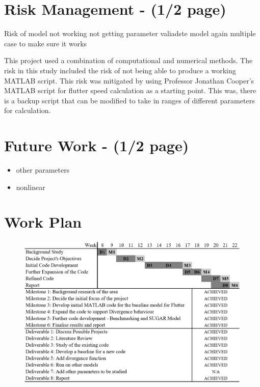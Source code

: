 \documentclass[11pt]{article}
\begin{document}
\section{Risk Management - (1/2 page)}
Risk of model not working
not getting parameter
valiadste model again multiple case to make sure it works

This project used a combination of computational and numerical methods. The risk in this study included the risk of not being able to produce a working MATLAB script. This risk was mitigated by using Professor Jonathan Cooper's MATLAB script \cite{Wright2015INTRODUCTIONLOADS} for flutter speed calculation as a starting point. This was, there is a backup script that can be modified to take in ranges of different parameters for calculation. 

\section{Future Work - (1/2 page)}
\begin{itemize}
    \item other parameters
    \item nonlinear
\end{itemize}

\section{Work Plan}
\begin{figure}[H]
    \centering
    \includegraphics[width = .9\textwidth]{figures/dandm.png}
\end{figure}
\end{document}
